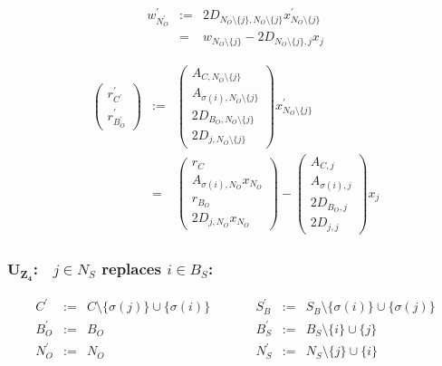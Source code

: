 \documentclass[a4paper]{article}
\begin{document}
\begin{eqnarray}
w_{N_{O}^{\prime}}^{\prime}
&:=&
2D_{N_{O} \setminus \{j\}, N_{O} \setminus \{j\}}
x_{N_{O} \setminus \{j\}}^{\prime}
\nonumber \\
&=&
w_{N_{O} \setminus \{j\}}
-
2D_{N_{O} \setminus \{j\}, j}x_{j}
\end{eqnarray}

\begin{eqnarray}
\left(
\begin{array}{c}
r_{C^{\prime}}^{\prime} \\
\hline
r_{B_{O}^{\prime}}^{\prime}
\end{array}
\right)
&:=&
\left(
\begin{array}{c}
A_{C, N_{O} \setminus \{j\}} \\
\hline
A_{\sigma(i), N_{O} \setminus \{j\}} \\
\hline
2D_{B_{O}, N_{O} \setminus \{j\}} \\
\hline
2D_{j, N_{O} \setminus \{j\}} 
\end{array}
\right)
x_{N_{O} \setminus \{j\}}^{\prime} 
\nonumber \\
&=&
\left(
\begin{array}{c}
r_{C} \\
\hline
A_{\sigma(i), N_{O}}x_{N_{O}} \\
\hline
r_{B_{O}} \\
\hline
2D_{j, N_{O}}x_{N_{O}}
\end{array}
\right)
-
\left(
\begin{array}{c}
A_{C, j} \\
\hline
A_{\sigma(i), j} \\
\hline
2D_{B_{O}, j} \\
\hline
2D_{j, j}
\end{array}
\right)
x_{j}
\end{eqnarray}

\subsubsection{$\mathbf{U_{Z_{4}}}$:$\quad j \in N_{S}$ replaces $i \in B_{S}$:}
\begin{equation}
\label{update:s_z_rep_s}
\begin{array}{ccccccc}
C^{\prime}      &:=&  C \setminus \{\sigma(j)\} \cup \{\sigma(i)\}
&\quad\quad&
S_{B}^{\prime}  &:=&  S_{B} \setminus  \{\sigma(i)\} \cup \{\sigma(j)\}   \\
B_{O}^{\prime}  &:=&  B_{O}
&\quad\quad&
B_{S}^{\prime}  &:=&  B_{S} \setminus \{i\} \cup \{j\} \\
N_{O}^{\prime}  &:=&  N_{O}
&\quad\quad&
N_{S}^{\prime}  &:=&  N_{S} \setminus \{j\} \cup \{i\} 
\end{array}
\end{equation}
\end{document}
